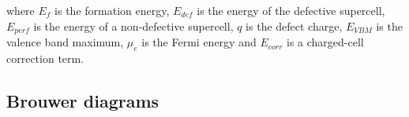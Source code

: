 where $E_{f}$ is the formation energy, $E_{def}$ is the energy of the defective supercell, $E_{perf}$ is the energy of a non-defective supercell, $q$ is the defect charge, $E_{VBM}$ is the valence band maximum, $\mu_{e}$ is the Fermi energy and $E_{corr}$ is a charged-cell correction term.

\subsection{Brouwer diagrams}

%
%
%
%
%

